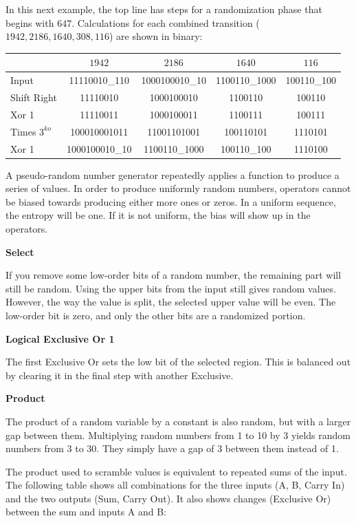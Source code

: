 \documentclass[letterpaper]{article}
\begin{document}
\begin{multicols}{2}
In this next example, the top line has steps for a randomization phase that begins with $647$. Calculations for each combined transition ($1942, 2186, 1640, 308, 116$) are shown in binary:

\begin{table}
\centering
\begin{tabular}{|l|c|c|c|c|}
\hline
& \textbf{$1942$} & \textbf{$2186$} & \textbf{$1640$} & \textbf{$116$} \\ 
\hline
Input&11110010\_110&1000100010\_10&1100110\_1000&100110\_100 \\ 
\hline
Shift Right&11110010&1000100010&1100110&100110 \\ 
\hline
Xor 1&11110011&1000100011&1100111&100111 \\ 
\hline
Times $3^{ko}$&100010001011&11001101001&100110101&1110101 \\ 
\hline
Xor 1&1000100010\_10&1100110\_1000&100110\_100&1110100 \\ 
\hline
\end{tabular}
\end{table}

A pseudo-random number generator repeatedly applies a function to produce a series of values. In order to produce uniformly random numbers, operators cannot be biased towards producing either more ones or zeros. In a uniform sequence, the entropy will be one. If it is not uniform, the bias will show up in the operators.

\textbf{Select}

If you remove some low-order bits of a random number, the remaining part will still be random. Using the upper bits from the input still gives random values. However, the way the value is split, the selected upper value will be even. The low-order bit is zero, and only the other bits are a randomized portion.

\textbf{Logical Exclusive Or 1}

The first Exclusive Or sets the low bit of the selected region. This is balanced out by clearing it in the final step with another Exclusive.

\textbf{Product}

The product of a random variable by a constant is also random, but with a larger gap between them. Multiplying random numbers from 1 to 10 by 3 yields random numbers from 3 to 30. They simply have a gap of 3 between them instead of 1.

The product used to scramble values is equivalent to repeated sums of the input. The following table shows all combinations for the three inputs (A, B, Carry In) and the two outputs (Sum, Carry Out). It also shows changes (Exclusive Or) between the sum and inputs A and B:


\end{multicols}
\end{document}
